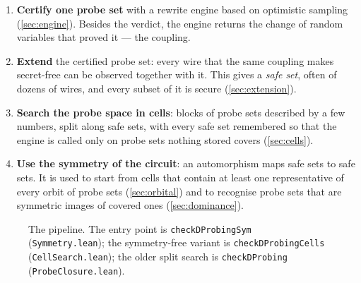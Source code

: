 \documentclass[11pt,a4paper]{article}
\theoremstyle{definition}
\theoremstyle{remark}
\newcommand{\code}[1]{\texttt{\small #1}}
\newcommand{\lean}[2]{\code{#1}\,(\code{#2})}
\begin{document}
\begin{enumerate}[leftmargin=*,label=\textbf{(\arabic*)}]
\item \textbf{Certify one probe set} with a rewrite engine based on optimistic sampling
  (\cref{sec:engine}).  Besides the verdict, the engine returns the change of random
  variables that proved it --- the coupling.
\item \textbf{Extend} the certified probe set: every wire that the same coupling makes
  secret-free can be observed together with it.  This gives a \emph{safe set}, often of
  dozens of wires, and every subset of it is secure (\cref{sec:extension}).
\item \textbf{Search the probe space in cells}: blocks of probe sets described by a few
  numbers, split along safe sets, with every safe set remembered so that the engine is
  called only on probe sets nothing stored covers (\cref{sec:cells}).
\item \textbf{Use the symmetry of the circuit}: an automorphism maps safe sets to safe
  sets.  It is used to start from cells that contain at least one representative of every
  orbit of probe sets (\cref{sec:orbital}) and to recognise probe sets that are symmetric images of covered ones
  (\cref{sec:dominance}).
\end{enumerate}

\begin{figure}[ht]
\centering
{}
\caption{The pipeline.  The entry point is \lean{checkDProbingSym}{Symmetry.lean}; the
symmetry-free variant is \lean{checkDProbingCells}{CellSearch.lean}; the older split search
is \lean{checkDProbing}{ProbeClosure.lean}.}
\label{fig:pipeline}
\end{figure}
\end{document}
